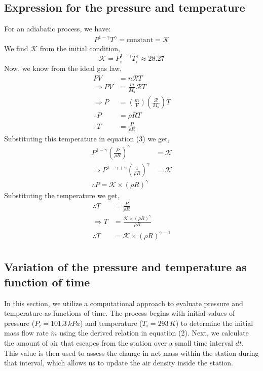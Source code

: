 \documentclass[a4paper, 14pt]{extarticle}
\begin{document}
\subsection{Expression for the pressure and temperature}
For an adiabatic process, we have:
\begin{align}
    P^{1 - \gamma} T^{\gamma} = \text{constant} = \mathcal{K}
\end{align}
We find $\mathcal{K}$ from the initial condition,
\[
\mathcal{K} = P_i^{1 - \gamma} T_i^{\gamma} \approx 28.27
\]
Now, we know from the ideal gas law,
\begin{align*}
    PV &= n\mathcal{R} T \\
    \Rightarrow PV &= \frac{m}{M_a} \mathcal{R} T \\
    \Rightarrow P &= \left(\frac{m}{V}\right) \left(\frac{\mathcal{R}}{M_a}\right) T \\
    \therefore P &= \rho R T \\
    \therefore T &= \frac{P}{\rho R}
\end{align*}
Substituting this temperature in equation (3) we get,
\begin{align*}
    P^{1 - \gamma} \left( \frac{P}{\rho R} \right)^{\gamma} &= \mathcal{K} \\
    \Rightarrow P^{1 - \gamma + \gamma} \left( \frac{1}{\rho R} \right)^{\gamma} &= \mathcal{K} \\
    \therefore P = \mathcal{K} \times (\rho R)^{\gamma}
\end{align*}
Substituting the temperature we get,
\begin{align*}
    \therefore T &= \frac{P}{\rho R} \\
    \Rightarrow T &= \frac{\mathcal{K} \times (\rho R)^{\gamma}}{\rho R} \\
    \therefore T &= \mathcal{K} \times (\rho R)^{\gamma-1} \\
\end{align*}

\subsection{Variation of the pressure and temperature as function of time}
\vspace{1cm}
In this section, we utilize a computational approach to evaluate pressure and temperature as functions of time. The process begins with initial values of pressure ($P_i=101.3\,kPa$) and temperature ($T_i=293\,K$) to determine the initial mass flow rate $\dot{m}$ using the derived relation in equation (2).
\newpage
Next, we calculate the amount of air that escapes from the station over a small time interval $dt$. This value is then used to assess the change in net mass within the station during that interval, which allows us to update the air density inside the station. \\
\end{document}

